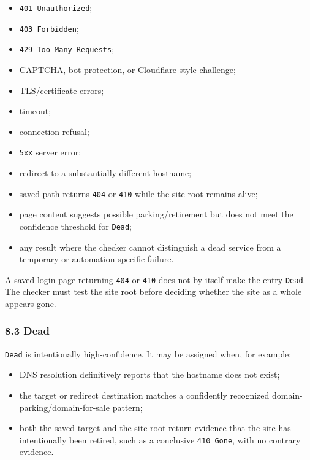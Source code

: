 \documentclass[
  letterpaper,
]{article}
\newcommand{\passthrough}[1]{#1}
\providecommand{\tightlist}{%
  \setlength{\itemsep}{0pt}\setlength{\parskip}{0pt}}
\begin{document}
\begin{itemize}
\tightlist
\item
  \passthrough{\lstinline!401 Unauthorized!};
\item
  \passthrough{\lstinline!403 Forbidden!};
\item
  \passthrough{\lstinline!429 Too Many Requests!};
\item
  CAPTCHA, bot protection, or Cloudflare-style challenge;
\item
  TLS/certificate errors;
\item
  timeout;
\item
  connection refusal;
\item
  \passthrough{\lstinline!5xx!} server error;
\item
  redirect to a substantially different hostname;
\item
  saved path returns \passthrough{\lstinline!404!} or \passthrough{\lstinline!410!} while the site root remains alive;
\item
  page content suggests possible parking/retirement but does not meet the confidence threshold for
  \passthrough{\lstinline!Dead!};
\item
  any result where the checker cannot distinguish a dead service from a temporary or automation-specific failure.
\end{itemize}

A saved login page returning \passthrough{\lstinline!404!} or \passthrough{\lstinline!410!} does not by itself make the
entry \passthrough{\lstinline!Dead!}. The checker must test the site root before deciding whether the site as a whole
appears gone.

\subsubsection{8.3 Dead}\label{83-dead}

\passthrough{\lstinline!Dead!} is intentionally high-confidence. It may be assigned when, for example:

\begin{itemize}
\tightlist
\item
  DNS resolution definitively reports that the hostname does not exist;
\item
  the target or redirect destination matches a confidently recognized domain-parking/domain-for-sale pattern;
\item
  both the saved target and the site root return evidence that the site has intentionally been retired, such as a
  conclusive \passthrough{\lstinline!410 Gone!}, with no contrary evidence.
\end{itemize}
\end{document}
